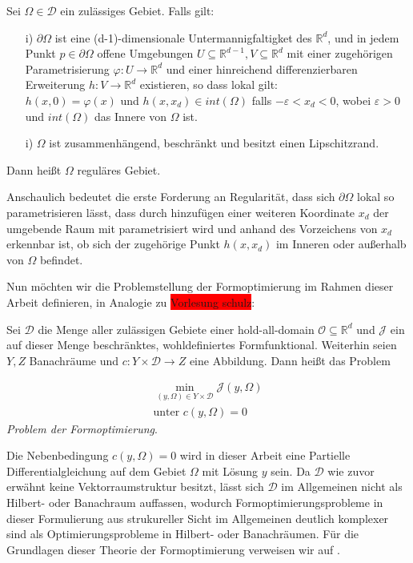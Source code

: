 \begin{defi}\label{regu}
Sei $\Omega \in \mathcal{D}$ ein zulässiges Gebiet. Falls gilt:
\begin{itemize}
\item[i)] $\partial \Omega$ ist eine (d-1)-dimensionale Untermannigfaltigket des $\mathbb{R}^d$, und in jedem Punkt $p\in \partial \Omega$ offene Umgebungen $U\subseteq \mathbb{R}^{d-1}, V\subseteq \mathbb{R}^d$ mit einer zugehörigen Parametrisierung $\varphi: U \rightarrow \mathbb{R}^d$ und einer hinreichend differenzierbaren Erweiterung $h: V \rightarrow \mathbb{R}^d$ existieren, so dass lokal gilt:\\
$h(x,0) = \varphi(x)$ und $h(x,x_d) \in int(\Omega)$ falls $-\varepsilon < x_d < 0$, wobei $\varepsilon > 0$ und $int(\Omega)$ das Innere von $\Omega$ ist.
\item[i)] $\Omega$ ist zusammenhängend, beschränkt und besitzt einen Lipschitzrand.
\end{itemize}
Dann heißt $\Omega$ reguläres Gebiet.
\end{defi}

Anschaulich bedeutet die erste Forderung an Regularität, dass sich $\partial\Omega$ lokal so parametrisieren lässt, dass durch hinzufügen einer weiteren Koordinate $x_d$ der umgebende Raum mit parametrisiert wird und anhand des Vorzeichens von $x_d$ erkennbar ist, ob sich der zugehörige Punkt $h(x,x_d)$ im Inneren oder außerhalb von $\Omega$ befindet.

Nun möchten wir die Problemstellung der Formoptimierung im Rahmen dieser Arbeit definieren, in Analogie zu \colorbox{red}{Vorlesung schulz}:

\begin{defi}
Sei $\mathcal{D}$ die Menge aller zulässigen Gebiete einer hold-all-domain $\mathcal{O}\subseteq\mathbb{R}^d$ und $\mathcal{J}$ ein auf dieser Menge beschränktes, wohldefiniertes Formfunktional. Weiterhin seien $Y,Z$ Banachräume und $c: Y\times \mathcal{D} \rightarrow Z$ eine Abbildung. Dann heißt das Problem

\begin{align*}
	\underset{(y,\Omega) \in Y \times \mathcal{D}}{\min} \mathcal{J}(y,\Omega) \\
	\text{unter } c(y, \Omega) = 0
\end{align*}
\textit{Problem der Formoptimierung}.
\end{defi}

Die Nebenbedingung $c(y, \Omega) = 0$ wird in dieser Arbeit eine Partielle Differentialgleichung auf dem Gebiet $\Omega$ mit Lösung $y$ sein. Da $\mathcal{D}$ wie zuvor erwähnt keine Vektorraumstruktur besitzt, lässt sich $\mathcal{D}$ im Allgemeinen nicht als Hilbert- oder Banachraum auffassen, wodurch Formoptimierungsprobleme in dieser Formulierung aus strukureller Sicht im Allgemeinen deutlich komplexer sind als Optimierungsprobleme in Hilbert- oder Banachräumen. Für die Grundlagen dieser Theorie der Formoptimierung verweisen wir auf \cite{shape_space}.

